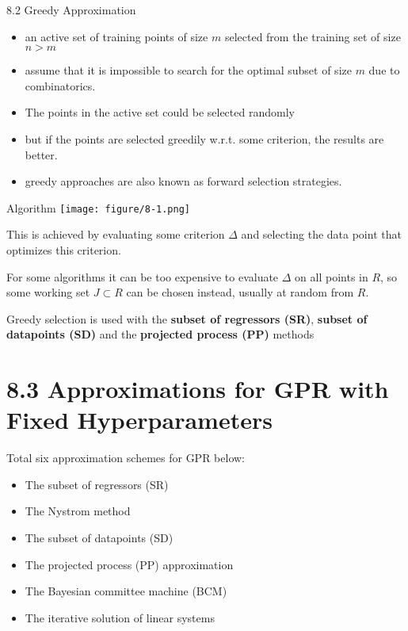 \documentclass[
  ignorenonframetext,
]{beamer}
\begin{document}
\begin{frame}{8.2 Greedy Approximation}
\protect\hypertarget{greedy-approximation-1}{}
\begin{itemize}
\item
  an active set of training points of size \(m\) selected from the
  training set of size \(n > m\)
\item
  assume that it is impossible to search for the optimal subset of size
  \(m\) due to combinatorics.
\item
  The points in the active set could be selected randomly
\item
  but if the points are selected greedily w.r.t. some criterion, the
  results are better.
\item
  greedy approaches are also known as forward selection strategies.
\end{itemize}
\end{frame}

\begin{frame}{Algorithm}
\protect\hypertarget{algorithm}{}
\texttt{[image: figure/8-1.png]}
\end{frame}

\begin{frame}{}
\protect\hypertarget{section-7}{}
This is achieved by evaluating some criterion \(\Delta\) and selecting
the data point that optimizes this criterion.

For some algorithms it can be too expensive to evaluate \(\Delta\) on
all points in \(R\), so some working set \(J \subset R\) can be chosen
instead, usually at random from \(R\).

Greedy selection is used with the \textbf{subset of regressors (SR)},
\textbf{subset of datapoints (SD)} and the \textbf{projected process
(PP)} methods
\end{frame}

\hypertarget{approximations-for-gpr-with-fixed-hyperparameters}{%
\section{8.3 Approximations for GPR with Fixed
Hyperparameters}\label{approximations-for-gpr-with-fixed-hyperparameters}}

\begin{frame}{Total six approximation schemes for GPR below:}
\protect\hypertarget{total-six-approximation-schemes-for-gpr-below}{}
\begin{itemize}
\item
  The subset of regressors (SR)
\item
  The Nystrom method
\item
  The subset of datapoints (SD)
\item
  The projected process (PP) approximation
\item
  The Bayesian committee machine (BCM)
\item
  The iterative solution of linear systems
\end{itemize}
\end{frame}
\end{document}
